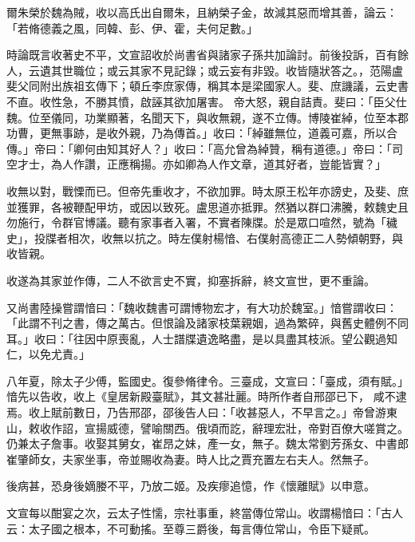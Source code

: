 \begin{pinyinscope}
 爾朱榮於魏為賊，收以高氏出自爾朱，且納榮子金，故減其惡而增其善，論云：「若脩德義之風，同韓、彭、伊、霍，夫何足數。」



 時論既言收著史不平，文宣詔收於尚書省與諸家子孫共加論討。前後投訴，百有餘人，云遺其世職位；或云其家不見記錄；或云妄有非毀。收皆隨狀答之。，范陽盧斐父同附出族祖玄傳下；頓丘李庶家傳，稱其本是梁國家人。斐、庶譏議，云史書不直。收性急，不勝其憤，啟誣其欲加屠害。
 帝大怒，親自詰責。斐曰：「臣父仕魏。位至儀同，功業顯著，名聞天下，與收無親，遂不立傳。博陵崔綽，位至本郡功曹，更無事跡，是收外親，乃為傳首。」收曰：「綽雖無位，道義可嘉，所以合傳。」帝曰：「卿何由知其好人？」收曰：「高允曾為綽贊，稱有道德。」帝曰：「司空才士，為人作讚，正應稱揚。亦如卿為人作文章，道其好者，豈能皆實？」



 收無以對，戰慄而已。但帝先重收才，不欲加罪。時太原王松年亦謗史，及斐、庶並獲罪，各被鞭配甲坊，或因以致死。盧思道亦抵罪。然猶以群口沸騰，敕魏史且勿施行，令群官博議。聽有家事者入署，不實者陳牒。於是眾口喧然，號為「穢
 史」，投牒者相次，收無以抗之。時左僕射楊愔、右僕射高德正二人勢傾朝野，與收皆親。



 收遂為其家並作傳，二人不欲言史不實，抑塞拆辭，終文宣世，更不重論。



 又尚書陸操嘗謂愔曰：「魏收魏書可謂博物宏才，有大功於魏室。」愔嘗謂收曰：「此謂不刊之書，傳之萬古。但恨論及諸家枝葉親姻，過為繁碎，與舊史體例不同耳。」收曰：「往因中原喪亂，人士譜牒遺逸略盡，是以具盡其枝派。望公觀過知仁，以免尤責。」



 八年夏，除太子少傅，監國史。復參脩律令。三臺成，文宣曰：「臺成，須有賦。」愔先以告收，收上《皇居新殿臺賦》，其文甚壯麗。時所作者自邢邵已下，
 咸不逮焉。收上賦前數日，乃告邢邵，邵後告人曰：「收甚惡人，不早言之。」帝曾游東山，敕收作詔，宣揚威德，譬喻關西。俄頃而訖，辭理宏壯，帝對百僚大嗟賞之。仍兼太子詹事。收娶其舅女，崔昂之妹，產一女，無子。魏太常劉芳孫女、中書郎崔肇師女，夫家坐事，帝並賜收為妻。時人比之賈充置左右夫人。然無子。



 後病甚，恐身後嫡媵不平，乃放二姬。及疾瘳追憶，作《懷離賦》以申意。



 文宣每以酣宴之次，云太子性懦，宗社事重，終當傳位常山。收謂楊愔曰：「古人云：太子國之根本，不可動搖。至尊三爵後，每言傳位常山，令臣下疑貳。




\end{pinyinscope}
